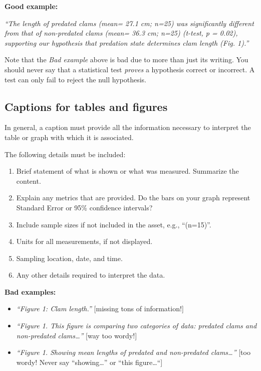 \documentclass[
]{book}
\providecommand{\tightlist}{%
  \setlength{\itemsep}{0pt}\setlength{\parskip}{0pt}}
\begin{document}
\textbf{Good example:}

\emph{``The length of predated clams (mean= 27.1 cm; n=25) was significantly different from that of non-predated clams (mean= 36.3 cm; n=25) (t-test, p = 0.02), supporting our hypothesis that predation state determines clam length (Fig. 1).''}

Note that the \emph{Bad example} above is bad due to more than just its writing. You should never say that a statistical test \emph{proves} a hypothesis correct or incorrect. A test can only fail to reject the null hypothesis.

\hypertarget{captions-for-tables-and-figures}{%
\subsection*{Captions for tables and figures}\label{captions-for-tables-and-figures}}

In general, a caption must provide all the information necessary to interpret the table or graph with which it is associated.

The following details must be included:

\begin{enumerate}
\def\labelenumi{\arabic{enumi}.}
\tightlist
\item
  Brief statement of what is shown or what was measured. Summarize the content.
\item
  Explain any metrics that are provided. Do the bars on your graph represent Standard Error or 95\% confidence intervals?
\item
  Include sample sizes if not included in the asset, e.g., ``(n=15)''.
\item
  Units for all measurements, if not displayed.\\
\item
  Sampling location, date, and time.\\
\item
  Any other details required to interpret the data.
\end{enumerate}

\textbf{Bad examples:}

\begin{itemize}
\tightlist
\item
  \emph{``Figure 1: Clam length.''} {[}missing tons of information!{]}\\
\item
  \emph{``Figure 1. This figure is comparing two categories of data: predated clams and non-predated clams\ldots{}''} {[}way too wordy!{]}
\item
  \emph{``Figure 1. Showing mean lengths of predated and non-predated clams\ldots{}''} {[}too wordy! Never say ``showing\ldots{}'' or ``this figure\ldots``{]}
\end{itemize}
\end{document}
